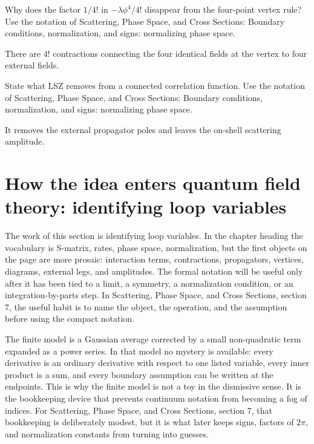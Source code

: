 \begin{exercise}
Why does the factor \(1/4!\) in \(-\lambda\phi^4/4!\) disappear from the four-point vertex rule?  Use the notation of Scattering, Phase Space, and Cross Sections: Boundary conditions, normalization, and signs: normalizing phase space.
\begin{answer}
There are \(4!\) contractions connecting the four identical fields at the vertex to four external fields.
\end{answer}
\end{exercise}

\begin{exercise}
State what LSZ removes from a connected correlation function.  Use the notation of Scattering, Phase Space, and Cross Sections: Boundary conditions, normalization, and signs: normalizing phase space.
\begin{answer}
It removes the external propagator poles and leaves the on-shell scattering amplitude.
\end{answer}
\end{exercise}



\section{How the idea enters quantum field theory: identifying loop variables}

The work of this section is identifying loop variables.  In the chapter heading the vocabulary is S-matrix, rates, phase space, normalization, but the first objects on the page are more prosaic: interaction terms, contractions, propagators, vertices, diagrams, external legs, and amplitudes.  The formal notation will be useful only after it has been tied to a limit, a symmetry, a normalization condition, or an integration-by-parts step.  In Scattering, Phase Space, and Cross Sections, section 7, the useful habit is to name the object, the operation, and the assumption before using the compact notation.

The finite model is a Gaussian average corrected by a small non-quadratic term expanded as a power series.  In that model no mystery is available: every derivative is an ordinary derivative with respect to one listed variable, every inner product is a sum, and every boundary assumption can be written at the endpoints.  This is why the finite model is not a toy in the dismissive sense.  It is the bookkeeping device that prevents continuum notation from becoming a fog of indices.  For Scattering, Phase Space, and Cross Sections, section 7, that bookkeeping is deliberately modest, but it is what later keeps signs, factors of \(2\pi\), and normalization constants from turning into guesses.


